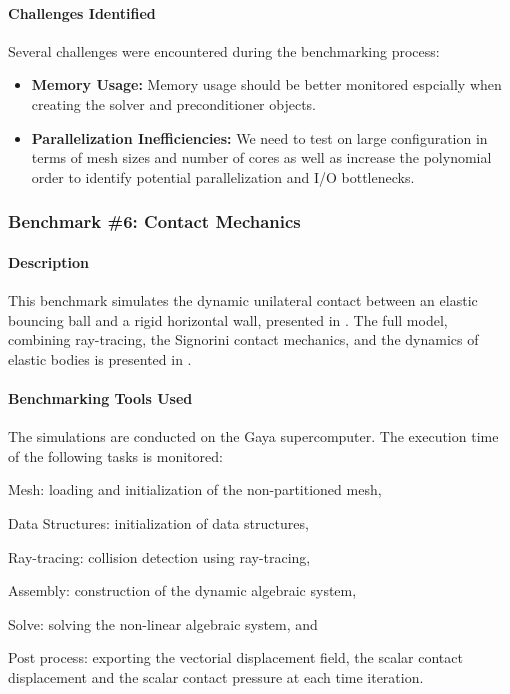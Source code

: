 \paragraph{Challenges Identified}
Several challenges were encountered during the benchmarking process:
\begin{itemize}
    \item \textbf{Memory Usage:} Memory usage should be better monitored espcially when creating the solver and preconditioner objects.
    \item \textbf{Parallelization Inefficiencies:} We need to test on large configuration in terms of mesh sizes and number of cores as well as increase the polynomial order to identify potential parallelization and I/O bottlenecks.
\end{itemize}



\subsubsection{Benchmark \#6: Contact Mechanics}

\paragraph{Description}
This benchmark simulates the dynamic unilateral contact between an elastic bouncing
ball and a rigid horizontal wall, presented in \cite{chouly_explicit_2018}. The full model,
combining ray-tracing, the Signorini contact mechanics, and the dynamics of elastic bodies
is presented in \cite{van_landeghem_motion_nodate}. \\


\paragraph{Benchmarking Tools Used}

The simulations are conducted on the Gaya supercomputer. The execution time of the
following tasks is monitored:

\begin{inparaenum}[\it (i)]
    \item Mesh: loading and initialization of the non-partitioned mesh,
    \item Data Structures: initialization of data structures,
    \item Ray-tracing: collision detection using ray-tracing,
    \item Assembly: construction of the dynamic algebraic system,
    \item Solve: solving the non-linear algebraic system, and
    \item Post process: exporting the vectorial displacement field, the scalar contact displacement and the scalar contact pressure at each time iteration.
\end{inparaenum}

